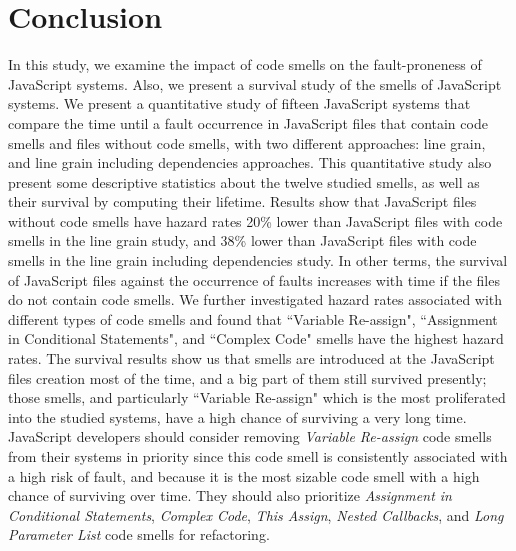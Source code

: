 \section{Conclusion}\label{conclusion}

In this study, we examine the impact of code smells on the fault-proneness of JavaScript systems. {\color{blue}Also, we present a survival study of the smells of JavaScript systems.} We present a quantitative study of {\color{blue}fifteen} JavaScript systems that compare the time until a fault occurrence in JavaScript files that contain code smells and files without code smells, {\color{blue}with two different approaches: line grain, and line grain including dependencies approaches}. {\color{blue}This quantitative study also present some descriptive statistics about the twelve studied smells, as well as their survival by computing their lifetime.} Results show that JavaScript files without code smells have hazard rates {\color{blue}20\%} lower than JavaScript files with code smells {\color{blue}in the line grain study, and 38\% lower than JavaScript files with code smells in the line grain including dependencies study}. In other terms, the survival of JavaScript files against the occurrence of faults increases with time if the files do not contain code smells. We further investigated hazard rates associated with different types of code smells and found that ``Variable Re-assign", ``Assignment in Conditional Statements", {\color{blue}and ``Complex Code"} smells have the highest hazard rates. {\color{blue}The survival results show us that smells are introduced at the JavaScript files creation most of the time, and a big part of them still survived presently; those smells, and particularly ``Variable Re-assign" which is the most proliferated into the studied systems, have a high chance of surviving a very long time.} JavaScript developers should consider removing \emph{Variable Re-assign} code smells from their systems in priority since this code smell is consistently associated with a high risk of fault, {\color{blue}and because it is the most sizable code smell with a high chance of surviving over time}. They should also prioritize \emph{Assignment in Conditional Statements}, \emph{Complex Code}, \emph{This Assign}, \emph{Nested Callbacks}, and \emph{Long Parameter List} code smells for refactoring.

